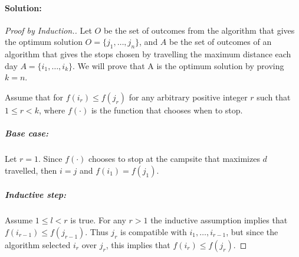 \documentclass[12pt]{article}
\begin{document}
\paragraph{Solution:}
\begin{proof}[Proof by Induction.]

Let $O$ be the set of outcomes from the algorithm that gives the optimum solution $O =
\{j_1,\dots,j_n\}$, and $A$ be the set of outcomes of an algorithm that
gives the stops chosen by travelling the maximum distance each day $A =
\{i_1,\dots,i_k\}$. We will prove that A is the optimum solution by
proving $k = n$.

Assume that for $f(i_r) \le f(j_r)$ for any arbitrary positive integer
$r$ such
that $1 \le r < k $, where $f(\cdot)$ is the function that chooses when
to stop.

\subparagraph{Base case:}
Let $r = 1$. Since $f(\cdot)$ chooses to stop at the campsite that
maximizes $d$ travelled, then $i = j$ and $f(i_1) = f(j_1)$.

\subparagraph{Inductive step:}
Assume $1 \le l < r$ is true. For any $r > 1$ the inductive assumption
implies that $f(i_{r-1}) \le f(j_{r-1})$. Thus $j_r$ is compatible with
$i_1,\dots,i_{r-1}$, but since the algorithm selected $i_r$ over $j_r$,
this implies that $f(i_r) \le f(j_r)$.



\end{proof}
\end{document}
